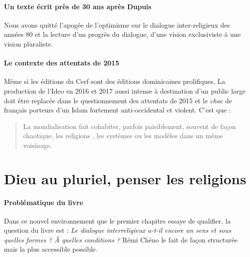 \paragraph{Un texte écrit près de 30 ans après Dupuis} Nous avons quitté l'apogée de l'optimisme sur le dialogue inter-religieux des années 80 et la lecture d'un progrès du dialogue, d'une vision exclusiviste à une vision pluraliste.


\paragraph{Le contexte des attentats de 2015} Même si les éditions du Cerf sont des éditions dominicaines prolifiques, La production de l'Ideo en 2016 et 2017 aussi intense à destination d'un public large doit être replacée dans le questionnement des attentats de 2015 et le \textit{choc} de français porteurs d'un Islam fortement anti-occidental et violent. C'est que : 
\begin{quote}
     La mondialisation fait cohabiter, parfois paisiblement, souvent de façon chaotique, les religions , les systèmes ou les modèles dans un même voisinage. 
\end{quote}

 

\section{Dieu au pluriel, penser les religions}
\paragraph{Problématique du livre} Dans ce nouvel environnement que le premier chapitre essaye de qualifier, la question du livre est : \textit{Le dialogue interreligieux a-t-il encore un sens et sous quelles formes ? À quelles conditions ?} Rémi Chéno le fait de façon structurée mais la plus accessible possible. 

